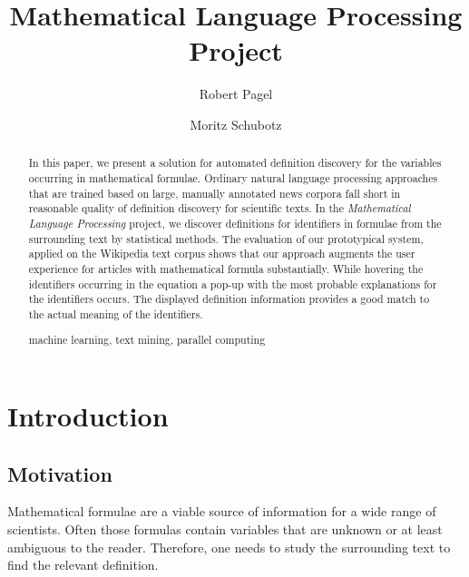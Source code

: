 \documentclass[runningheads]{llncs}
\newcommand{\keywords}[1]{\par\addvspace\baselineskip
\noindent\keywordname\enspace\ignorespaces#1}
\begin{document}
\mainmatter

\title{Mathematical Language Processing \\ Project}

\author{Robert Pagel \and Moritz Schubotz}



\maketitle


\begin{abstract}
In this paper, we present a solution for automated definition discovery for the variables occurring in mathematical formulae.
Ordinary natural language processing approaches that are trained based on large, manually annotated news corpora fall short in reasonable quality of definition discovery for scientific texts.
In the \emph{Mathematical Language Processing} project, we discover definitions %
 for identifiers in formulae from the surrounding text by statistical methods.
The evaluation of our prototypical system, applied on the Wikipedia text corpus shows that our approach augments the user experience for articles with mathematical formula substantially.
While hovering the identifiers occurring in the equation a pop-up with the most probable explanations for the identifiers occurs. The displayed definition information provides a good match to the actual meaning of the identifiers.
\keywords{machine learning, text mining, parallel computing}
\end{abstract}
 

\section{Introduction}


\subsection{Motivation}
Mathematical formulae are a viable source of information for a wide range of scientists. Often those formulas contain variables that are unknown or at least ambiguous to the reader. Therefore, one needs to study the surrounding text to find the relevant definition.
\end{document}
